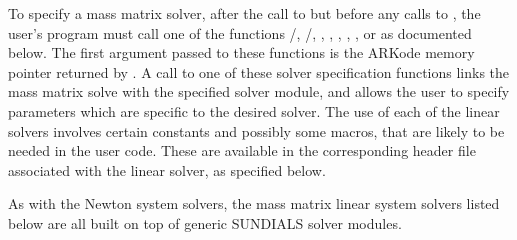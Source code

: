 \documentclass[letterpaper,10pt,english]{sphinxmanual}
\begin{document}
To specify a mass matrix solver, after the call to
{\hyperref[c_interface/User_callable:ARKodeCreate]{}} but before any calls to {\hyperref[c_interface/User_callable:ARKode]{}},
the user's program must call one of the functions
{\hyperref[c_interface/User_callable:ARKMassDense]{}}/{\hyperref[c_interface/User_callable:ARKMassLapackDense]{}},
{\hyperref[c_interface/User_callable:ARKMassBand]{}}/{\hyperref[c_interface/User_callable:ARKMassLapackBand]{}},
{\hyperref[c_interface/User_callable:ARKMassKLU]{}}, {\hyperref[c_interface/User_callable:ARKMassSuperLUMT]{}},
{\hyperref[c_interface/User_callable:ARKMassSpgmr]{}}, {\hyperref[c_interface/User_callable:ARKMassSpbcg]{}},
{\hyperref[c_interface/User_callable:ARKMassSptfqmr]{}}, {\hyperref[c_interface/User_callable:ARKMassSpfgmr]{}} or
{\hyperref[c_interface/User_callable:ARKMassPcg]{}} as documented below. The first argument passed
to these functions is the ARKode memory pointer returned by
{\hyperref[c_interface/User_callable:ARKodeCreate]{}}. A call to one of these solver specification
functions links the mass matrix solve with the specified solver
module, and allows the user to specify parameters which are specific
to the desired solver.  The use of each of the linear solvers involves
certain constants and possibly some macros, that are likely to be
needed in the user code. These are available in the corresponding
header file associated with the linear solver, as specified below.

As with the Newton system solvers, the mass matrix linear system
solvers listed below are all built on top of generic SUNDIALS solver
modules.
\end{document}
